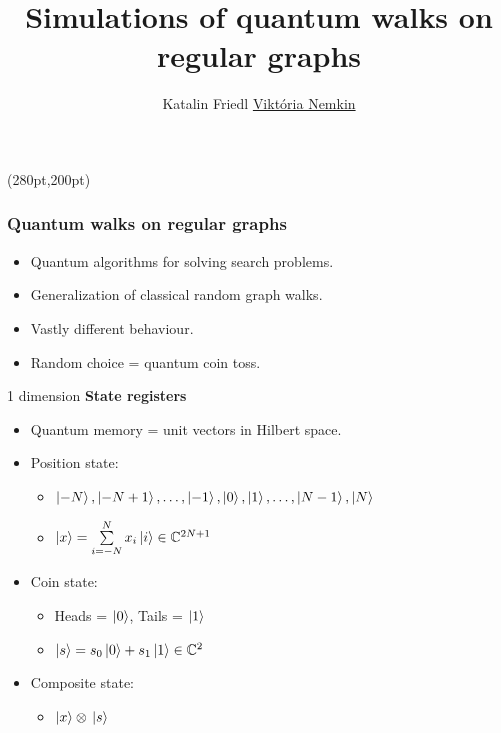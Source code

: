\documentclass[aspectratio=169]{beamer}
\title{Simulations of quantum walks on regular graphs}
\author[Katalin Friedl, \underline{Viktória Nemkin}]{Katalin Friedl \hspace{2cm} \underline{Viktória Nemkin}}
\date{}
\begin{document}
\begin{frame}

\titlepage

\begin{textblock*}{150pt}(280pt,200pt) %

\end{textblock*}
\end{frame}

\begin{frame}
  \frametitle{Quantum walks on regular graphs}

  \begin{itemize}
      \item Quantum algorithms for solving search problems.
      \item Generalization of classical random graph walks.
      \item Vastly different behaviour.
      \item Random choice = quantum coin toss.
  \end{itemize}
\end{frame}

\begin{frame}{1 dimension}
\textbf{State registers}
\begin{itemize}
    \item Quantum memory = unit vectors in Hilbert space. \pause
    \item Position state: \pause
    \begin{itemize}
        \item $\ket{-N},\ket{-N+1},\dots,\ket{-1},\ket{0},\ket{1},\dots,\ket{N-1},\ket{N}$ \pause
        \item $\ket{x} = \sum\limits_{i=-N}^{N}x_i\ket{i} \in{} \mathbb{C}^{2N+1}$ \pause
    \end{itemize}
    \item Coin state: \pause
    \begin{itemize}
        \item Heads = $\ket{0}$, Tails = $\ket{1}$ \pause
        \item $\ket{s} = s_0 \ket{0} + s_1 \ket{1} \in \mathbb{C}^2$ \pause
    \end{itemize}
    \item Composite state: \pause
    \begin{itemize}
        \item $\ket{x}\otimes{}\ket{s}$
    \end{itemize}
\end{itemize}
\end{frame}
\end{document}
